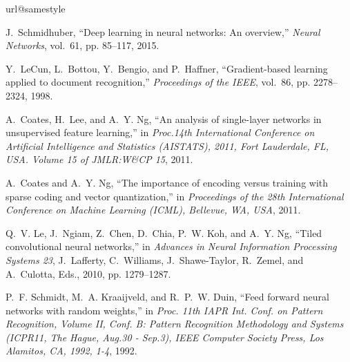 \documentclass[conference]{IEEEtran}
\begin{document}
\begin{thebibliography}{10}
\providecommand{\url}[1]{#1}
\csname url@samestyle\endcsname
\providecommand{\newblock}{\relax}
\providecommand{\bibinfo}[2]{#2}
\providecommand{\BIBentrySTDinterwordspacing}{\spaceskip=0pt\relax}
\providecommand{\BIBentryALTinterwordstretchfactor}{4}
\providecommand{\BIBentryALTinterwordspacing}{\spaceskip=\fontdimen2\font plus
\BIBentryALTinterwordstretchfactor\fontdimen3\font minus
  \fontdimen4\font\relax}
\providecommand{\BIBforeignlanguage}[2]{{%
\expandafter\ifx\csname l@#1\endcsname\relax
\typeout{** WARNING: IEEEtran.bst: No hyphenation pattern has been}%
\typeout{** loaded for the language `#1'. Using the pattern for}%
\typeout{** the default language instead.}%
\else
\language=\csname l@#1\endcsname
\fi
#2}}
\providecommand{\BIBdecl}{\relax}
\BIBdecl

J.~Schmidhuber, ``Deep learning in neural networks: {A}n overview,''
  \emph{Neural Networks}, vol.~61, pp. 85--117, 2015.

Y.~LeCun, L.~Bottou, Y.~Bengio, and P.~Haffner, ``Gradient-based learning
  applied to document recognition,'' \emph{Proceedings of the IEEE}, vol.~86,
  pp. 2278--2324, 1998.

A.~Coates, H.~Lee, and A.~Y. Ng, ``An analysis of single-layer networks in
  unsupervised feature learning,'' in \emph{Proc.14th International Conference
  on Artificial Intelligence and Statistics (AISTATS), 2011, Fort Lauderdale,
  FL, USA. Volume 15 of JMLR:W\&CP 15}, 2011.

A.~Coates and A.~Y. Ng, ``The importance of encoding versus training with
  sparse coding and vector quantization,'' in \emph{Proceedings of the 28th
  International Conference on Machine Learning (ICML), Bellevue, WA, USA},
  2011.

Q.~V. Le, J.~Ngiam, Z.~Chen, D.~Chia, P.~W. Koh, and A.~Y. Ng, ``Tiled
  convolutional neural networks,'' in \emph{Advances in Neural Information
  Processing Systems 23}, J.~Lafferty, C.~Williams, J.~Shawe-Taylor, R.~Zemel,
  and A.~Culotta, Eds., 2010, pp. 1279--1287.

P.~F. Schmidt, M.~A. Kraaijveld, and R.~P.~W. Duin, ``Feed forward neural
  networks with random weights,'' in \emph{Proc. 11th IAPR Int. Conf. on
  Pattern Recognition, Volume II, Conf. B: Pattern Recognition Methodology and
  Systems (ICPR11, The Hague, Aug.30 - Sep.3), IEEE Computer Society Press, Los
  Alamitos, CA, 1992, 1-4}, 1992.


\end{thebibliography}
\end{document}
